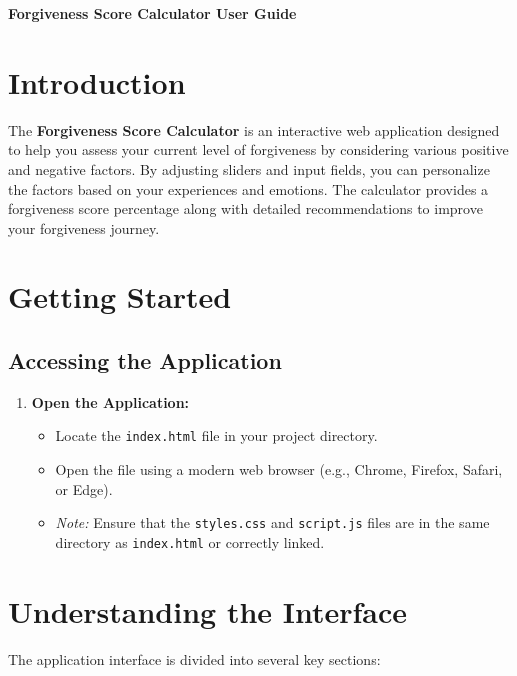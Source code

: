 \documentclass[11pt]{article}
\begin{document}
\begin{center}
    {\LARGE \textbf{Forgiveness Score Calculator User Guide}}
\end{center}

\section*{Introduction}

The \textbf{Forgiveness Score Calculator} is an interactive web application designed to help you assess your current level of forgiveness by considering various positive and negative factors. By adjusting sliders and input fields, you can personalize the factors based on your experiences and emotions. The calculator provides a forgiveness score percentage along with detailed recommendations to improve your forgiveness journey.

\section*{Getting Started}

\subsection*{Accessing the Application}

\begin{enumerate}
    \item \textbf{Open the Application:}
    \begin{itemize}
        \item Locate the \texttt{index.html} file in your project directory.
        \item Open the file using a modern web browser (e.g., Chrome, Firefox, Safari, or Edge).
        \item \textit{Note:} Ensure that the \texttt{styles.css} and \texttt{script.js} files are in the same directory as \texttt{index.html} or correctly linked.
    \end{itemize}
\end{enumerate}

\section*{Understanding the Interface}

The application interface is divided into several key sections:
\end{document}
